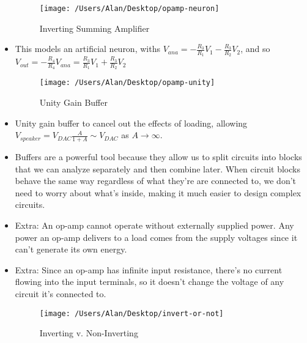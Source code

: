 \documentclass{article}
\begin{document}
\begin{itemize}
\begin{figure} [h!]
	\begin{center}
	\texttt{[image: /Users/Alan/Desktop/opamp-neuron]}
	\caption{Inverting Summing Amplifier}
	\label{fig}
	\end{center}
\end{figure}
	\item This models an artificial neuron, withs $V_{ana} = -\frac{R_3}{R_1}V_1 - \frac{R_3}{R_2}V_2$, and so {\color{red} $V_{out} = -\frac{R_4}{R_4}V_{ana} = \frac{R_3}{R_1}V_1 + \frac{R_3}{R_2}V_2$}

\begin{figure} [h!]
	\begin{center}
	\texttt{[image: /Users/Alan/Desktop/opamp-unity]}
	\caption{Unity Gain Buffer}
	\label{fig}
	\end{center}
\end{figure}
	\item {\color{blue} Unity gain buffer} to cancel out the effects of loading, allowing $V_{speaker} = V_{DAC}\frac{A}{1+A}\sim V_{DAC}$ as $A\rightarrow\infty$.
	\item Buffers are a powerful tool because they allow us to split circuits into blocks that we can analyze separately and then combine later. When circuit blocks behave the same way regardless of what they’re are connected to, we don’t need to worry about what’s inside, making it much easier to design complex circuits.

	\item Extra: An op-amp cannot operate without externally supplied power. Any power an op-amp delivers to a load comes from the supply voltages since it can't generate its own energy.
	\item Extra: Since an op-amp has infinite input resistance, there's no current flowing into the input terminals, so it doesn't change the voltage of any circuit it's connected to.

\begin{figure} [h!]
	\begin{center}
	\texttt{[image: /Users/Alan/Desktop/invert-or-not]}
	\caption{Inverting v. Non-Inverting}
	\label{fig}
	\end{center}
\end{figure}

\end{itemize}
\end{document}
